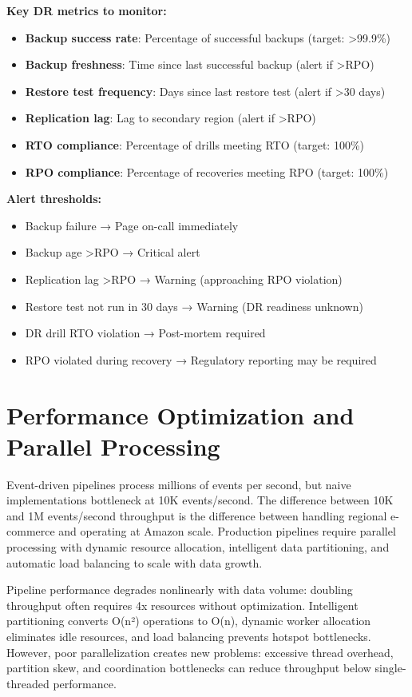 \textbf{Key DR metrics to monitor:}
\begin{itemize}
    \item \textbf{Backup success rate}: Percentage of successful backups (target: >99.9\%)
    \item \textbf{Backup freshness}: Time since last successful backup (alert if >RPO)
    \item \textbf{Restore test frequency}: Days since last restore test (alert if >30 days)
    \item \textbf{Replication lag}: Lag to secondary region (alert if >RPO)
    \item \textbf{RTO compliance}: Percentage of drills meeting RTO (target: 100\%)
    \item \textbf{RPO compliance}: Percentage of recoveries meeting RPO (target: 100\%)
\end{itemize}

\textbf{Alert thresholds:}
\begin{itemize}
    \item Backup failure → Page on-call immediately
    \item Backup age >RPO → Critical alert
    \item Replication lag >RPO → Warning (approaching RPO violation)
    \item Restore test not run in 30 days → Warning (DR readiness unknown)
    \item DR drill RTO violation → Post-mortem required
    \item RPO violated during recovery → Regulatory reporting may be required
\end{itemize}

\section{Performance Optimization and Parallel Processing}

Event-driven pipelines process millions of events per second, but naive implementations bottleneck at 10K events/second. The difference between 10K and 1M events/second throughput is the difference between handling regional e-commerce and operating at Amazon scale. Production pipelines require parallel processing with dynamic resource allocation, intelligent data partitioning, and automatic load balancing to scale with data growth.

Pipeline performance degrades nonlinearly with data volume: doubling throughput often requires 4x resources without optimization. Intelligent partitioning converts O(n²) operations to O(n), dynamic worker allocation eliminates idle resources, and load balancing prevents hotspot bottlenecks. However, poor parallelization creates new problems: excessive thread overhead, partition skew, and coordination bottlenecks can reduce throughput below single-threaded performance.

